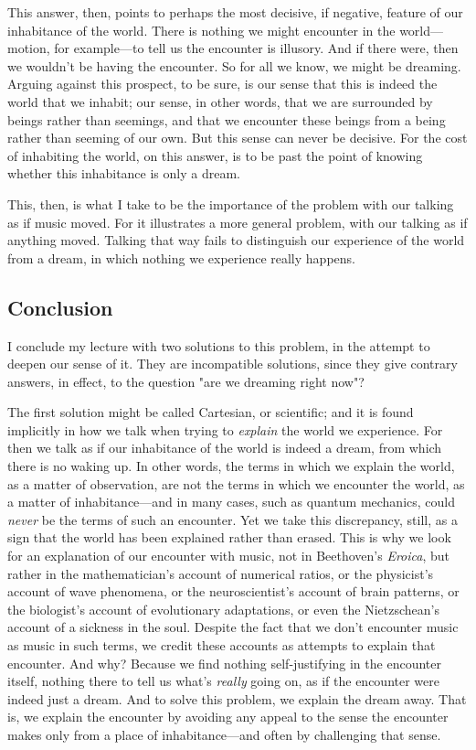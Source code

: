 \documentclass[12pt]{memoir}
\begin{document}
This answer, then, points to perhaps the most
decisive, if negative, feature of our inhabitance
of the world. There is nothing we might encounter
in the world---motion, for example---to tell us
the encounter is illusory. And if there were, then
we wouldn't be having the encounter. So for all
we know, we might be dreaming. Arguing against
this prospect, to be sure, is our sense that this
is indeed the world that we inhabit; our sense,
in other words, that we are surrounded by beings
rather than seemings, and that we encounter these
beings from a being rather than seeming of our
own. But this sense can never be decisive. For
the cost of inhabiting the world, on this answer,
is to be past the point of knowing whether this
inhabitance is only a dream.

This, then, is what I take to be the importance of
the problem with our talking as if music moved.
For it illustrates a more general problem, with
our talking as if anything moved. Talking that
way fails to distinguish our experience of the
world from a dream, in which nothing we experience
really happens.

\subsection{Conclusion}

I conclude my lecture with two solutions to this
problem, in the attempt to deepen our sense of it.
They are incompatible solutions, since they give
contrary answers, in effect, to the question "are
we dreaming right now"?

The first solution might be called Cartesian, or
scientific; and it is found implicitly in how we
talk when trying to \emph{explain} the world we
experience. For then we talk as if our inhabitance
of the world is indeed a dream, from which there
is no waking up. In other words, the terms in
which we explain the world, as a matter of
observation, are not the terms in which we
encounter the world, as a matter of
inhabitance---and in many cases, such as quantum
mechanics, could \emph{never} be the terms of such an
encounter. Yet we take this discrepancy, still, as
a sign that the world has been explained rather
than erased. This is why we look for an
explanation of our encounter with music, not in
Beethoven's \emph{Eroica}, but rather in the
mathematician's account of numerical ratios, or
the physicist's account of wave phenomena, or the
neuroscientist's account of brain patterns, or the
biologist's account of evolutionary adaptations,
or even the Nietzschean's account of a sickness in
the soul. Despite the fact that we don't encounter
music as music in such terms, we credit these
accounts as attempts to explain that encounter.
And why? Because we find nothing self-justifying
in the encounter itself, nothing there to tell us
what's \emph{really} going on, as if the encounter were
indeed just a dream. And to solve this problem, we
explain the dream away. That is, we explain the
encounter by avoiding any appeal to the sense the
encounter makes only from a place of
inhabitance---and often by challenging that sense.
\end{document}
